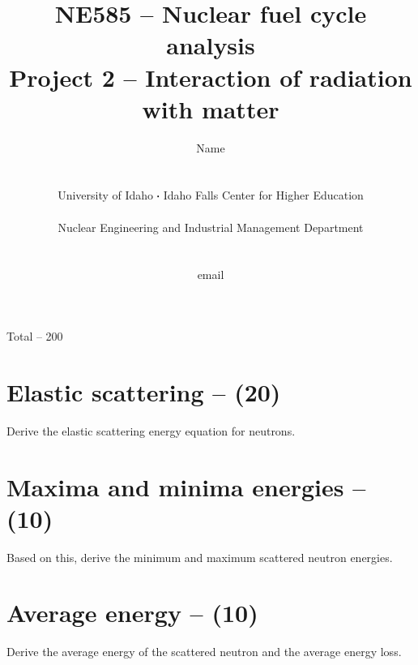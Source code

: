 \documentclass[11pt,a4paper]{article}
\newcommand*\sq{\mathbin{\vcenter{\hbox{\rule{.3ex}{.3ex}}}}} %
\begin{document}
\begin{titlepage}
    \title{
        NE585 -- Nuclear fuel cycle analysis\\
        Project 2 -- Interaction of radiation with matter\\
    }
    \author{
        Name
        \\ \\ \\
        University of Idaho $\sq$ Idaho Falls Center for Higher Education
        \\ \\
        Nuclear Engineering and Industrial Management Department
        \\ \\ \\
        email 
    }
\clearpage %
\maketitle
\vspace*{\fill}
\begin{flushright}{
        Total -- 200
}
\end{flushright}
\thispagestyle{empty} %
\end{titlepage}


\section{Elastic scattering -- (20)}
Derive the elastic scattering energy equation for neutrons.





\newpage

\section{Maxima and minima energies -- (10)}
Based on this, derive the minimum and maximum scattered neutron energies.





\newpage

\section{Average energy -- (10)}
Derive the average energy of the scattered neutron and the average energy loss.
\end{document}
